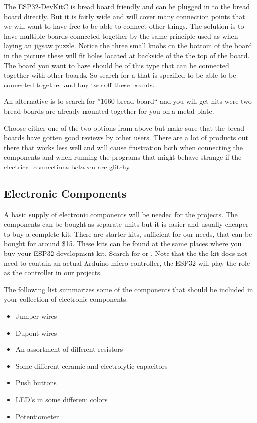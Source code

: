 \documentclass{tufte-book}
\begin{document}
The ESP32-DevKitC is bread board friendly and can be plugged in to the bread 
board directly. But it is fairly wide and will cover many connection points 
that we will want to have free to be able to connect other things. 
The solution is to have multiple boards connected together by the same 
principle used as when laying an jigsaw puzzle. Notice the three small knobs on 
the bottom of the board in the picture these will fit holes located at backside 
of the the top of the board. The board you want to have should be of this type 
that can be connected together with other boards. So search for a
 that is specified to be able to be connected
together and buy two off these boards.

An alternative is to search for ''1660 bread board`` and you will get hits were 
two bread boards are already mounted together for you on a metal plate.

Choose either one of the two options fram above but make sure that the bread
boards have gotten good reviews by other users. There are a lot of 
products out there that works less well and will cause frustration both when 
connecting the components and when running the programs that might behave 
strange if the electrical connections between are glitchy.

\subsection{Electronic Components}
A basic supply of electronic components will be needed for the projects. 
The components can be bought as separate units but it is easier and usually 
cheaper to buy a complete kit. There are starter kits, sufficient for our 
needs, that can be bought for around \$15. These kits can be found at the same 
places where you buy your ESP32 development kit. Search for 
 or . 
Note that the the kit does not need to contain an actual Arduino micro 
controller, the ESP32 will play the role as the controller in our projects.

The following list summarizes some of the components that should be included in 
your collection of electronic components.

\begin{itemize}
	\item Jumper wires
	\item Dupont wires
	\item An assortment of different resistors
	\item Some different ceramic and electrolytic capacitors
	\item Push buttons
	\item LED's in some different colors 
	\item Potentiometer
\end{itemize}
\end{document}
